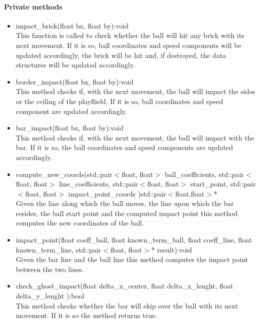 \documentclass[]{article}
\begin{document}
	\paragraph{Private methods}
	\begin{itemize}
	\item impact\_brick(float bx, float by):void\\ This function is called to check whether the ball will hit any brick with its next movement. If it is so, ball coordinates and speed components will be updated accordingly, the brick will be hit and, if destroyed, the data structures will be updated accordingly.
	\item border\_impact(float bx, float by):void \\This method checks if, with the next movement, the ball will impact the sides or the ceiling of the playflield. If it is so, ball coordinates and speed component are updated accordingly.
	\item bar\_impact(float bx, float by):void \\This method checks if, with the next movement, the ball will impact with the bar. If it is so, the ball coordinates and speed components are updated accordingly.
	\item compute\_new\_coords(std::pair$<$float, float$>$ ball\_coefficients, std::pair$<$float, float$>$ line\_coefficients, std::pair$<$float, float$>$ start\_point, std::pair$<$float, float$>$ impact\_point\_coords )std::pair$<$float,float$>$*\\Given the line along which the ball moves, the line upon which the bar resides, the ball start point and the computed impact point this method computes the new coordinates of the ball.
	\item impact\_point(float coeff\_ball, float known\_term\_ball, float coeff\_line, float known\_term\_line, std::pair$<$float, float$>$* result):void \\Given the bar line and the ball line this method computes the impact point between the two lines.
	\item check\_ghost\_impact(float delta\_x\_center, float  delta\_x\_lenght, float delta\_y\_lenght ):bool \\This method checks whether the bar will skip over the ball with its next movement. If it is so the method returns true.
	\end{itemize}
\end{document}
